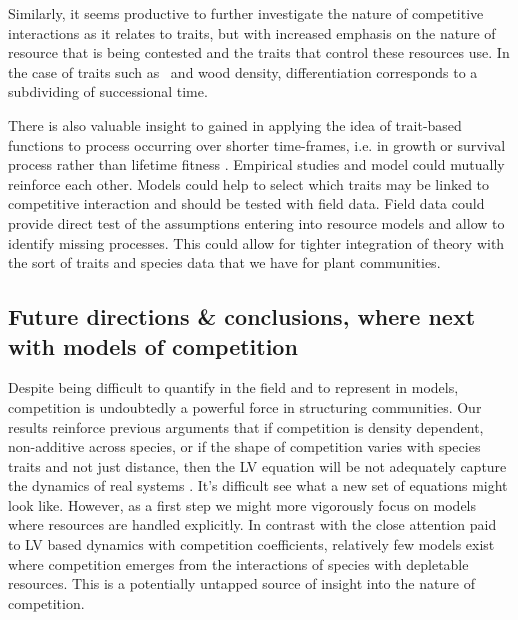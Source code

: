 \documentclass[a4paper,11pt]{article}
\begin{document}
{Similarly, it seems productive to further investigate the nature of competitive interactions as it relates to traits, but with increased emphasis on the nature of resource that is being contested and the traits that control these resources use. In the case of traits such as \lma\ and wood density, differentiation corresponds to a subdividing of successional time.

There is also valuable insight to gained in applying the idea of trait-based functions to process occurring over shorter time-frames, i.e. in growth or survival process rather than lifetime fitness
\citep[e.g.][]{Kunstler-2012, Lasky-2015, Kraft-2015}.
Empirical studies and model could mutually reinforce each other. Models could help to select which traits may be linked to competitive interaction and should be tested with field data. Field data could provide direct test of the assumptions entering into resource models and allow to identify missing processes. This could allow for tighter integration of theory with the sort of traits and species data that we have for plant communities.

\subsection{Future directions \& conclusions, where next with models of competition}

Despite being difficult to quantify in the field and to represent in models, competition is undoubtedly a powerful force in structuring communities. Our results reinforce previous arguments that if competition is density dependent, non-additive across species, or if the shape of competition varies with species traits and not just distance, then the
LV equation will be not adequately capture the dynamics of real systems \citep{Andrewartha-1953, Neill-1974, Abrams-1975,
  Wangersky-1978,Abrams-1980, Tilman-1987}.
It's difficult see what a new set of equations might look like.
However, as a first step we might more vigorously focus on models where resources are handled explicitly.
In contrast with the close attention paid to LV based dynamics with competition coefficients,
relatively few models exist where competition emerges from the interactions of species with depletable resources. This is a potentially untapped source of insight into the nature of competition.

}
\end{document}
